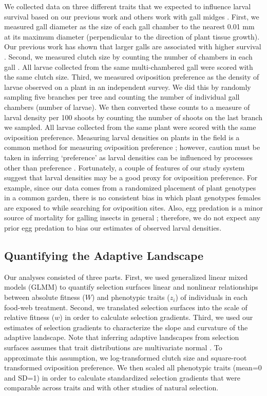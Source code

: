 \documentclass[11pt,]{article}
\begin{document}
We collected data on three different traits that we expected to
influence larval survival based on our previous work \citep{Barbour2016}
and others work with gall midges \citep{Weis1983, Heath2018}. First, we
measured gall diameter as the size of each gall chamber to the nearest
0.01 mm at its maximum diameter (perpendicular to the direction of plant
tissue growth). Our previous work has shown that larger galls are
associated with higher survival \citep{Barbour2016}. Second, we measured
clutch size by counting the number of chambers in each gall
\citep{Weis1983, Heath2018}. All larvae collected from the same
multi-chambered gall were scored with the same clutch size. Third, we
measured oviposition preference as the density of larvae observed on a
plant in an independent survey. We did this by randomly sampling five
branches per tree and counting the number of individual gall chambers
(number of larvae). We then converted these counts to a measure of
larval density per 100 shoots by counting the number of shoots on the
last branch we sampled. All larvae collected from the same plant were
scored with the same oviposition preference. Measuring larval densities
on plants in the field is a common method for measuring oviposition
preference \citep{Gripenberg2010}; however, caution must be taken in
inferring `preference' as larval densities can be influenced by
processes other than preference \citep{Singer1986}. Fortunately, a
couple of features of our study system suggest that larval densities may
be a good proxy for oviposition preference. For example, since our data
comes from a randomized placement of plant genotypes in a common garden,
there is no consistent bias in which plant genotypes females are exposed
to while searching for oviposition sites. Also, egg predation is a minor
source of mortality for galling insects in general \citep{Hawkins1997};
therefore, we do not expect any prior egg predation to bias our
estimates of observed larval densities.

\subsection{Quantifying the Adaptive
Landscape}\label{quantifying-the-adaptive-landscape}

Our analyses consisted of three parts. First, we used generalized linear
mixed models (GLMM) to quantify selection surfaces \textemdash linear
and nonlinear relationships between absolute fitness (\(W\)) and
phenotypic traits (\(z_i\)) of individuals \textemdash in each food-web
treatment. Second, we translated selection surfaces into the scale of
relative fitness (\(w\)) in order to calculate selection gradients.
Third, we used our estimates of selection gradients to characterize the
slope and curvature of the adaptive landscape. Note that inferring
adaptive landscapes from selection surfaces assumes that trait
distributions are multivariate normal \citep{Lande1983}. To approximate
this assumption, we log-transformed clutch size and square-root
transformed oviposition preference. We then scaled all phenotypic traits
(mean=0 and SD=1) in order to calculate standardized selection gradients
that were comparable across traits and with other studies of natural
selection.
\end{document}
